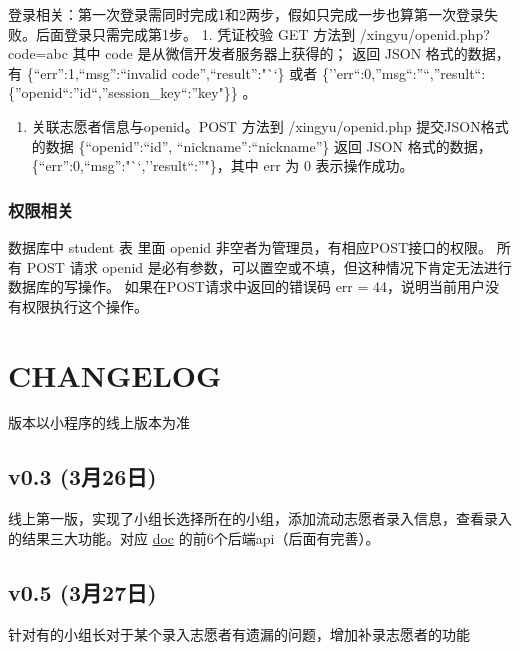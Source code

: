 \documentclass[]{ctexart}
\begin{document}
登录相关：第一次登录需同时完成1和2两步，假如只完成一步也算第一次登录失败。后面登录只需完成第1步。
1. 凭证校验 GET 方法到 /xingyu/openid.php?code=abc 其中 code
是从微信开发者服务器上获得的； 返回 JSON 格式的数据，有
\{``err'':1,``msg'':``invalid code'',``result'':"``\} 或者
\{''err``:0,''msg``:''``,''result``:\{''openid``:''id``,''session\_key``:''key"\}\}
。

\begin{enumerate}
\def\labelenumi{\arabic{enumi}.}
\setcounter{enumi}{1}
\item
  关联志愿者信息与openid。POST 方法到 /xingyu/openid.php
  提交JSON格式的数据 \{``openid'':``id'', ``nickname'':``nickname''\}
  返回 JSON 格式的数据，\{``err'':0,``msg'':"``,''result``:''"\}，其中
  err 为 0 表示操作成功。
\end{enumerate}

\hypertarget{ux6743ux9650ux76f8ux5173}{%
\subsubsection{权限相关}\label{ux6743ux9650ux76f8ux5173}}

数据库中 student 表 里面 openid 非空者为管理员，有相应POST接口的权限。
所有 POST 请求 openid
是必有参数，可以置空或不填，但这种情况下肯定无法进行数据库的写操作。
如果在POST请求中返回的错误码 err =
44，说明当前用户没有权限执行这个操作。

\hypertarget{changelog}{%
\section{CHANGELOG}\label{changelog}}

版本以小程序的线上版本为准

\subsection{v0.3 (3月26日)}\label{v0.3-3ux670826ux65e5}

线上第一版，实现了小组长选择所在的小组，添加流动志愿者录入信息，查看录入的结果三大功能。对应
\href{doc.md}{doc} 的前6个后端api（后面有完善）。

\hypertarget{v0.5-3ux670827ux65e5}{%
\subsection{v0.5 (3月27日)}\label{v0.5-3ux670827ux65e5}}

针对有的小组长对于某个录入志愿者有遗漏的问题，增加补录志愿者的功能
\end{document}
